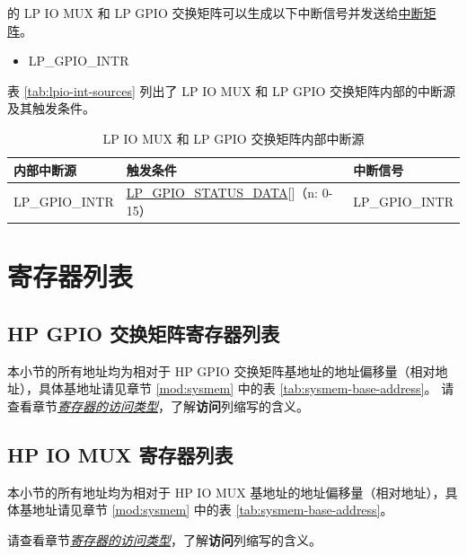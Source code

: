 \documentclass[main\_\_CN.tex]{subfiles}
\begin{document}
\chipname{} 的 LP IO MUX 和 LP GPIO 交换矩阵可以生成以下中断信号并发送给\hyperref[mod:intmtrx]{中断矩阵}。

    \begin{itemize}
        \item LP\_GPIO\_INTR
    \end{itemize}
表 \ref{tab:lpio-int-sources} 列出了 LP IO MUX 和 LP GPIO 交换矩阵内部的中断源及其触发条件。
\begin{longtable}{ | L{5cm} | L{6.5cm} | L{4cm} | }
\caption{LP IO MUX 和 LP GPIO 交换矩阵内部中断源} \label{tab:lpio-int-sources}
\\ \hline
{}
\textbf{内部中断源} & \textbf{触发条件}  &  \textbf{中断信号}\\ \hline

\label{int:LPGPIOINT}LP\_GPIO\_INTR  &  \hyperref[fielddesc:LPGPIOSTATUSDATA]{LP\_GPIO\_STATUS\_DATA}[]（n: 0-15）&  LP\_GPIO\_INTR  \\ \hline
\end{longtable}

\hypertarget{iomuxgpio-reg-summ}{}
\section{寄存器列表}
\subsection{HP GPIO 交换矩阵寄存器列表}
\label{sec:hp-gpio-reg-summ}
本小节的所有地址均为相对于 HP GPIO 交换矩阵基地址的地址偏移量（相对地址），具体基地址请见章节 \ref{mod:sysmem} \textit{} 中的表 \ref{tab:sysmem-base-address}。
请查看章节\hyperref[glossary-access-types]{\textit{寄存器的访问类型}}，了解\textbf{访问}列缩写的含义。



\subsection{HP IO MUX 寄存器列表}
本小节的所有地址均为相对于 HP IO MUX 基地址的地址偏移量（相对地址），具体基地址请见章节 \ref{mod:sysmem} \textit{} 中的表 \ref{tab:sysmem-base-address}。

请查看章节\hyperref[glossary-access-types]{\textit{寄存器的访问类型}}，了解\textbf{访问}列缩写的含义。


\end{document}
